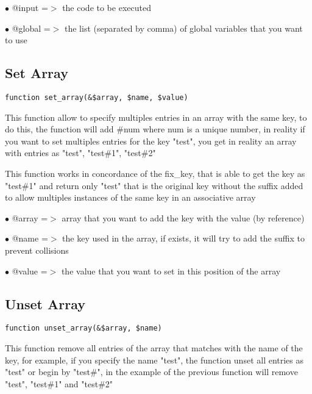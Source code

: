 \documentclass[a4paper]{book}
\begin{document}
\begin{compactitem}
\item[\color{myblue}$\bullet$] @input  =$>$ the code to be executed
\item[\color{myblue}$\bullet$] @global =$>$ the list (separated by comma) of global variables that you want to use
\end{compactitem}

\hypertarget{toc294}{}
\subsection{Set Array}

\begin{lstlisting}
function set_array(&$array, $name, $value)
\end{lstlisting}

This function allow to specify multiples entries in an array with the same key,
to do this, the function will add \#num where num is a unique number, in reality
if you want to set multiples entries for the key "test", you get in reality an
array with entries as "test", "test\#1", "test\#2"

This function works in concordance of the fix\_key, that is able to get the key
as "test\#1" and return only "test" that is the original key without the suffix
added to allow multiples instances of the same key in an associative array

\begin{compactitem}
\item[\color{myblue}$\bullet$] @array =$>$ array that you want to add the key with the value (by reference)
\item[\color{myblue}$\bullet$] @name  =$>$ the key used in the array, if exists, it will try to add the suffix to
          prevent collisions
\item[\color{myblue}$\bullet$] @value =$>$ the value that you want to set in this position of the array
\end{compactitem}

\hypertarget{toc295}{}
\subsection{Unset Array}

\begin{lstlisting}
function unset_array(&$array, $name)
\end{lstlisting}

This function remove all entries of the array that matches with the name of
the key, for example, if you specify the name "test", the function unset all
entries as "test" or begin by "test\#", in the example of the previous function
will remove "test", "test\#1" and "test\#2"
\end{document}
